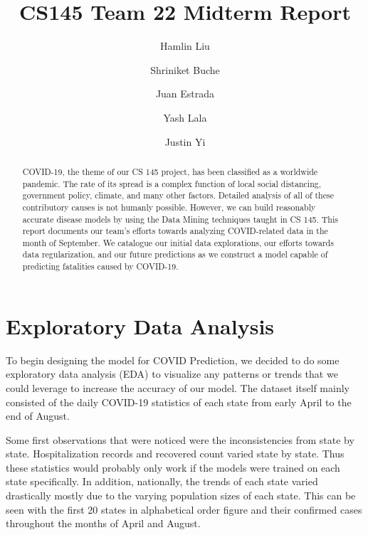 \documentclass[sigconf]{acmart}
\begin{document}
\title{CS145 Team 22 Midterm Report}

\author{Hamlin Liu}

\author{Shriniket Buche}

\author{Juan Estrada}

\author{Yash Lala}

\author{Justin Yi}

\renewcommand{\shortauthors}{Team 22}

\begin{abstract}
COVID-19, the theme of our CS 145 project, has been classified as a worldwide
pandemic. The rate of its spread is a complex function of local social
distancing, government policy, climate, and many other factors. Detailed
analysis of all of these contributory causes is not humanly possible. However,
we can build reasonably accurate disease models by using the Data Mining
techniques taught in CS 145. This report documents our team’s efforts towards
analyzing COVID-related data in the month of September. We catalogue our
initial data explorations, our efforts towards data regularization, and our
future predictions as we construct a model capable of predicting fatalities
caused by COVID-19. 
\end{abstract}

\maketitle

\section{Exploratory Data Analysis}

To begin designing the model for COVID Prediction, we decided to do some
exploratory data analysis (EDA) to visualize any patterns or trends that we
could leverage to increase the accuracy of our model. The dataset itself mainly
consisted of the daily COVID-19 statistics of each state from early April to
the end of August.

Some first observations that were noticed were the inconsistencies from state
by state. Hospitalization records and recovered count varied state by state.
Thus these statistics would probably only work if the models were trained on
each state specifically. In addition, nationally, the trends of each state
varied drastically mostly due to the varying population sizes of each state.
This can be seen with the first 20 states in alphabetical order figure and
their confirmed cases throughout the months of April and August.
\end{document}
